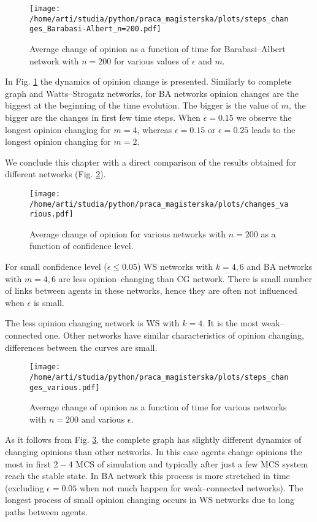 \documentclass[a4paper, 12pt]{article}
\begin{document}
\begin{figure}[H]
		\centering
		\texttt{[image: /home/arti/studia/python/praca\_magisterska/plots/steps\_changes\_Barabasi-Albert\_n=200.pdf]}
		\caption{Average change of opinion as a function of time for Barabasi--Albert network with $n=200$ for various values of $\epsilon$ and $m$.}
		\label{acba}
\end{figure}

In Fig. \ref{acba} the dynamics of opinion change is presented. Similarly to complete graph and Watts--Strogatz networks, for BA networks opinion changes are the biggest at the beginning of the time evolution. The bigger is the value of $m$, the bigger are the changes in first few time steps. When $\epsilon=0.15$ we observe the longest opinion changing for $m=4$, whereas $\epsilon=0.15$ or $\epsilon=0.25$ leads to the longest opinion changing for $m=2$.

\indent

We conclude this chapter with a direct comparison of the results obtained for different networks (Fig. \ref{f24}).

\begin{figure}[H]
		\centering
		\texttt{[image: /home/arti/studia/python/praca\_magisterska/plots/changes\_various.pdf]}
		\caption{Average change of opinion for various networks with $n=200$ as a function of confidence level.}
		\label{f24}
\end{figure}

For small confidence level ($\epsilon \leq 0.05$) WS networks with $k=4,6$ and BA networks with $m=4,6$ are less opinion--changing than CG network. There is small number of links between agents in these networks, hence they are often not influenced when $\epsilon$ is small.
\indent

The less opinion changing network is WS with $k=4$. It is the most weak--connected one. Other networks have similar characteristics of opinion changing, differences between the curves are small.

\begin{figure}[H]
		\centering
		\texttt{[image: /home/arti/studia/python/praca\_magisterska/plots/steps\_changes\_various.pdf]}
		\caption{Average change of opinion as a function of time for various networks with $n=200$ and various $\epsilon$.}
		\label{f25}
\end{figure}

As it follows from Fig. \ref{f25}, the complete graph  has slightly different dynamics of changing opinions than other networks. In this case agents change opinions the most in first $2-4$ MCS of simulation and typically after just a few MCS system reach the stable state. In BA network this process is more stretched in time (excluding $\epsilon=0.05$ when not much happen for weak--connected networks). 
The longest process of small opinion changing occurs in WS networks due to long paths between agents.
\end{document}
